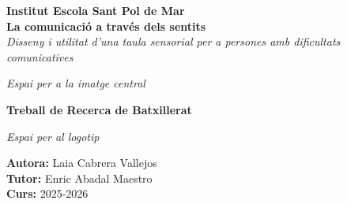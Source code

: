 \documentclass[12pt,a4paper,oneside]{report}
\begin{document}
\begin{titlepage}
    \centering
    \begin{tcolorbox}[colback=white, colframe=NavyBlue, arc=0pt, outer arc=0pt, height=24.5cm, boxrule=2pt]
        
        \vspace{1cm}
        {\Large \textbf{Institut Escola Sant Pol de Mar}} \\[2.5cm]
        
        {\Huge \textbf{La comunicació a través dels sentits}} \\[0.8cm]
        {\Large \textit{Disseny i utilitat d'una taula sensorial per a persones amb dificultats comunicatives}} \\[0.5cm]
        
        \begin{center}
            \begin{tcolorbox}[colback=gray!5, colframe=gray!20, width=10cm, height=6cm, halign=center, valign=center]
                \textcolor{gray!50}{\textit{Espai per a la imatge central}}
            \end{tcolorbox}
        \end{center}
        
        \vspace{1cm}
        
        \textbf{\large Treball de Recerca de Batxillerat} \\[1.5cm]
        
        \begin{minipage}[b]{0.45\textwidth}
            \begin{flushleft}
                \begin{tcolorbox}[colback=gray!5, colframe=gray!20, width=5cm, height=3.5cm, halign=center, valign=center]
                    \textcolor{gray!50}{\textit{Espai per al logotip}}
                \end{tcolorbox}
            \end{flushleft}
        \end{minipage}
        \hfill
        \begin{minipage}[b]{0.45\textwidth}
            \begin{flushright}
                \large
                \textbf{Autora:} Laia Cabrera Vallejos \\
                \textbf{Tutor:} Enric Abadal Maestro \\
                \textbf{Curs:} 2025-2026
            \end{flushright}
        \end{minipage}
        \vspace*{0.5cm} %
    \end{tcolorbox}
\end{titlepage}
\end{document}
